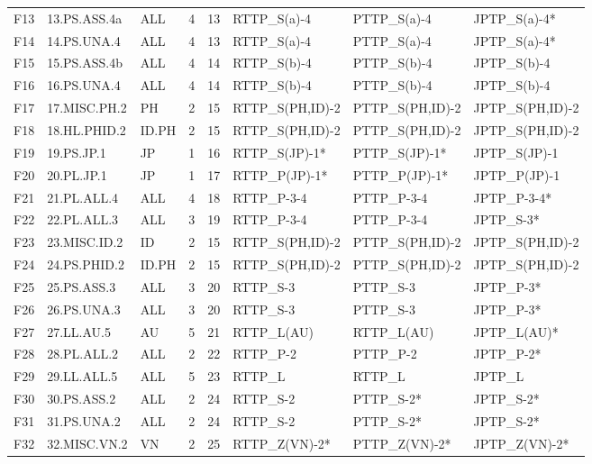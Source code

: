 \begin{table}[h]
\begin{tabular}{lllrrlll}
    F13 & 13.PS.ASS.4a & ALL   & 4 & 13 & RTTP\_S(a)-4     & PTTP\_S(a)-4     & JPTP\_S(a)-4*   \\
    F14 & 14.PS.UNA.4  & ALL   & 4 & 13 & RTTP\_S(a)-4     & PTTP\_S(a)-4     & JPTP\_S(a)-4*   \\
    F15 & 15.PS.ASS.4b & ALL   & 4 & 14 & RTTP\_S(b)-4     & PTTP\_S(b)-4     & JPTP\_S(b)-4    \\
    F16 & 16.PS.UNA.4  & ALL   & 4 & 14 & RTTP\_S(b)-4     & PTTP\_S(b)-4     & JPTP\_S(b)-4    \\
    F17 & 17.MISC.PH.2 & PH    & 2 & 15 & RTTP\_S(PH,ID)-2 & PTTP\_S(PH,ID)-2 & JPTP\_S(PH,ID)-2\\
    F18 & 18.HL.PHID.2 & ID.PH & 2 & 15 & RTTP\_S(PH,ID)-2 & PTTP\_S(PH,ID)-2 & JPTP\_S(PH,ID)-2\\
    F19 & 19.PS.JP.1   & JP    & 1 & 16 & RTTP\_S(JP)-1*   & PTTP\_S(JP)-1*   & JPTP\_S(JP)-1   \\
    F20 & 20.PL.JP.1   & JP    & 1 & 17 & RTTP\_P(JP)-1*   & PTTP\_P(JP)-1*   & JPTP\_P(JP)-1   \\
    F21 & 21.PL.ALL.4  & ALL   & 4 & 18 & RTTP\_P-3-4      & PTTP\_P-3-4      & JPTP\_P-3-4*    \\
    F22 & 22.PL.ALL.3  & ALL   & 3 & 19 & RTTP\_P-3-4      & PTTP\_P-3-4      & JPTP\_S-3*      \\
    F23 & 23.MISC.ID.2 & ID    & 2 & 15 & RTTP\_S(PH,ID)-2 & PTTP\_S(PH,ID)-2 & JPTP\_S(PH,ID)-2\\
    F24 & 24.PS.PHID.2 & ID.PH & 2 & 15 & RTTP\_S(PH,ID)-2 & PTTP\_S(PH,ID)-2 & JPTP\_S(PH,ID)-2\\
    F25 & 25.PS.ASS.3  & ALL   & 3 & 20 & RTTP\_S-3        & PTTP\_S-3        & JPTP\_P-3*      \\
    F26 & 26.PS.UNA.3  & ALL   & 3 & 20 & RTTP\_S-3        & PTTP\_S-3        & JPTP\_P-3*      \\
    F27 & 27.LL.AU.5   & AU    & 5 & 21 & RTTP\_L(AU)      & RTTP\_L(AU)      & JPTP\_L(AU)*    \\
    F28 & 28.PL.ALL.2  & ALL   & 2 & 22 & RTTP\_P-2        & PTTP\_P-2        & JPTP\_P-2*      \\
    F29 & 29.LL.ALL.5  & ALL   & 5 & 23 & RTTP\_L          & RTTP\_L          & JPTP\_L         \\
    F30 & 30.PS.ASS.2  & ALL   & 2 & 24 & RTTP\_S-2        & PTTP\_S-2*       & JPTP\_S-2*      \\
    F31 & 31.PS.UNA.2  & ALL   & 2 & 24 & RTTP\_S-2        & PTTP\_S-2*       & JPTP\_S-2*      \\
    F32 & 32.MISC.VN.2 & VN    & 2 & 25 & RTTP\_Z(VN)-2*   & PTTP\_Z(VN)-2*   & JPTP\_Z(VN)-2*  \\
    \hline
  \end{tabular}
\end{table}

